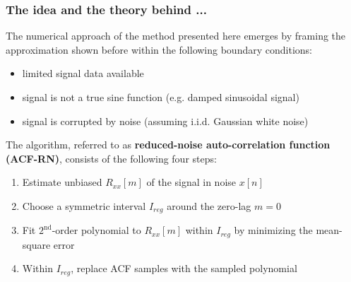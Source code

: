 \documentclass[11pt,aspectratio=169]{beamer}
\begin{document}
	\begin{frame}
		\frametitle{The idea and the theory behind ...}
		The numerical approach of the method presented here emerges by framing the approximation shown before within the following boundary conditions:
		\begin{itemize}
			\item limited signal data available
			\item signal is not a true sine function (e.g. damped sinusoidal signal)
			\item signal is corrupted by noise (assuming i.i.d. Gaussian white noise)
		\end{itemize}
		\vspace*{.5em}
		The algorithm, referred to as \textbf{reduced-noise auto-correlation function (ACF-RN)}, consists of the following four steps:
		\begin{enumerate}
			\item Estimate unbiased $R_{xx}[m]$ of the signal in noise $x[n]$
			\item Choose a symmetric interval $I_{reg}$ around the zero-lag $m = 0$
			\item Fit $2^{\text{nd}}$-order polynomial to $R_{xx}[m]$ within $I_{reg}$ by minimizing the mean-square error
			\item Within $I_{reg}$, replace ACF samples with the sampled polynomial
		\end{enumerate}
	\end{frame}
\end{document}
